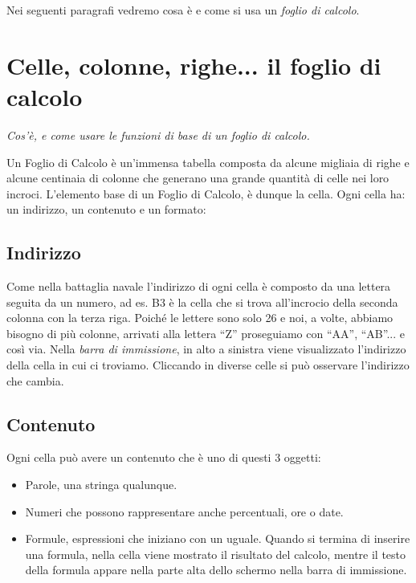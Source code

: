 Nei seguenti paragrafi vedremo cosa è e come si usa un \emph{foglio di calcolo}.

\section{Celle, colonne, righe... il foglio di calcolo}
\label{05_01_f_di_calc:celle-colonne-righe-il-foglio-di-calcolo}

\emph{Cos'è, e come usare le funzioni di base di un foglio di calcolo.}

Un Foglio di Calcolo è un'immensa tabella composta da alcune migliaia di
righe e alcune centinaia di colonne che generano una grande quantità di
celle nei loro incroci.
L'elemento base di un Foglio di Calcolo, è dunque la cella.
Ogni cella ha: un indirizzo, un contenuto e un  formato:

\subsection{Indirizzo}
\label{05_01_f_di_calc:indirizzo}

Come nella battaglia navale l'indirizzo di ogni cella è composto da una
lettera seguita da un numero, ad es. B3 è la cella che si trova all'incrocio
della seconda colonna con la terza riga. Poiché le lettere sono solo 26 e
noi, a volte, abbiamo bisogno di più colonne, arrivati alla lettera ``Z''
proseguiamo con ``AA'', ``AB''... e così via.
Nella \emph{barra di immissione}, in alto a sinistra viene visualizzato
l'indirizzo della cella in cui ci troviamo.
Cliccando in diverse celle si può osservare l'indirizzo che cambia.

\subsection{Contenuto}
\label{05_01_f_di_calc:contenuto}

Ogni cella può avere un contenuto che è uno di questi 3 oggetti:

\begin{itemize} [noitemsep]
\item Parole, una stringa qualunque.
\item Numeri che possono rappresentare anche percentuali, ore o date.
\item {}
Formule, espressioni che iniziano con un uguale. Quando si termina di
inserire una formula, nella cella viene mostrato il risultato del calcolo,
mentre il testo della formula appare nella parte alta dello schermo nella
barra di immissione.
\end{itemize}

